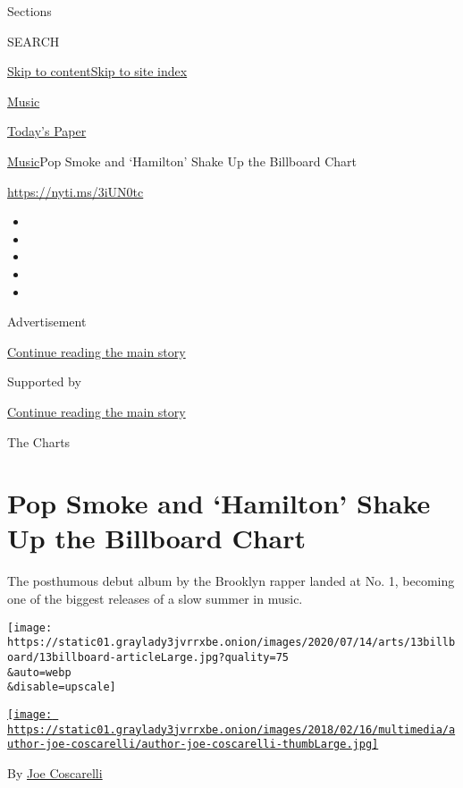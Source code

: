 Sections

SEARCH

\protect\hyperlink{site-content}{Skip to
content}\protect\hyperlink{site-index}{Skip to site index}

\href{https://www.nytimes3xbfgragh.onion/section/arts/music}{Music}

\href{https://myaccount.nytimes3xbfgragh.onion/auth/login?response_type=cookie\&client_id=vi}{}

\href{https://www.nytimes3xbfgragh.onion/section/todayspaper}{Today's
Paper}

\href{/section/arts/music}{Music}\textbar{}Pop Smoke and `Hamilton'
Shake Up the Billboard Chart

\url{https://nyti.ms/3iUN0tc}

\begin{itemize}
\item
\item
\item
\item
\item
\end{itemize}

Advertisement

\protect\hyperlink{after-top}{Continue reading the main story}

Supported by

\protect\hyperlink{after-sponsor}{Continue reading the main story}

The Charts

\hypertarget{pop-smoke-and-hamilton-shake-up-the-billboard-chart}{%
\section{Pop Smoke and `Hamilton' Shake Up the Billboard
Chart}\label{pop-smoke-and-hamilton-shake-up-the-billboard-chart}}

The posthumous debut album by the Brooklyn rapper landed at No. 1,
becoming one of the biggest releases of a slow summer in music.

\texttt{[image: https://static01.graylady3jvrrxbe.onion/images/2020/07/14/arts/13billboard/13billboard-articleLarge.jpg?quality=75\\\&auto=webp\\\&disable=upscale]}

\href{https://www.nytimes3xbfgragh.onion/by/joe-coscarelli}{\texttt{[image: https://static01.graylady3jvrrxbe.onion/images/2018/02/16/multimedia/author-joe-coscarelli/author-joe-coscarelli-thumbLarge.jpg]}}

By \href{https://www.nytimes3xbfgragh.onion/by/joe-coscarelli}{Joe
Coscarelli}

